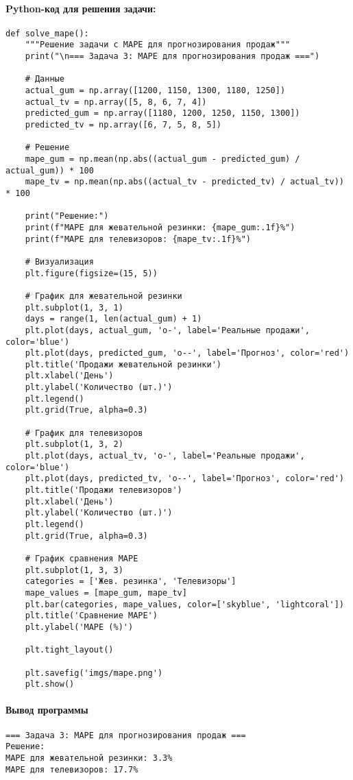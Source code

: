 \paragraph{Python-код для решения задачи:}

\begin{verbatim}
def solve_mape():
    """Решение задачи с MAPE для прогнозирования продаж"""
    print("\n=== Задача 3: MAPE для прогнозирования продаж ===")
    
    # Данные
    actual_gum = np.array([1200, 1150, 1300, 1180, 1250])
    actual_tv = np.array([5, 8, 6, 7, 4])
    predicted_gum = np.array([1180, 1200, 1250, 1150, 1300])
    predicted_tv = np.array([6, 7, 5, 8, 5])
    
    # Решение
    mape_gum = np.mean(np.abs((actual_gum - predicted_gum) / actual_gum)) * 100
    mape_tv = np.mean(np.abs((actual_tv - predicted_tv) / actual_tv)) * 100
    
    print("Решение:")
    print(f"MAPE для жевательной резинки: {mape_gum:.1f}%")
    print(f"MAPE для телевизоров: {mape_tv:.1f}%")
    
    # Визуализация
    plt.figure(figsize=(15, 5))
    
    # График для жевательной резинки
    plt.subplot(1, 3, 1)
    days = range(1, len(actual_gum) + 1)
    plt.plot(days, actual_gum, 'o-', label='Реальные продажи', color='blue')
    plt.plot(days, predicted_gum, 'o--', label='Прогноз', color='red')
    plt.title('Продажи жевательной резинки')
    plt.xlabel('День')
    plt.ylabel('Количество (шт.)')
    plt.legend()
    plt.grid(True, alpha=0.3)
    
    # График для телевизоров
    plt.subplot(1, 3, 2)
    plt.plot(days, actual_tv, 'o-', label='Реальные продажи', color='blue')
    plt.plot(days, predicted_tv, 'o--', label='Прогноз', color='red')
    plt.title('Продажи телевизоров')
    plt.xlabel('День')
    plt.ylabel('Количество (шт.)')
    plt.legend()
    plt.grid(True, alpha=0.3)
    
    # График сравнения MAPE
    plt.subplot(1, 3, 3)
    categories = ['Жев. резинка', 'Телевизоры']
    mape_values = [mape_gum, mape_tv]
    plt.bar(categories, mape_values, color=['skyblue', 'lightcoral'])
    plt.title('Сравнение MAPE')
    plt.ylabel('MAPE (%)')
    
    plt.tight_layout()
    
    plt.savefig('imgs/mape.png')
    plt.show()
\end{verbatim}
\paragraph{Вывод программы}
\begin{verbatim}
=== Задача 3: MAPE для прогнозирования продаж ===
Решение:
MAPE для жевательной резинки: 3.3%
MAPE для телевизоров: 17.7%
\end{verbatim}

